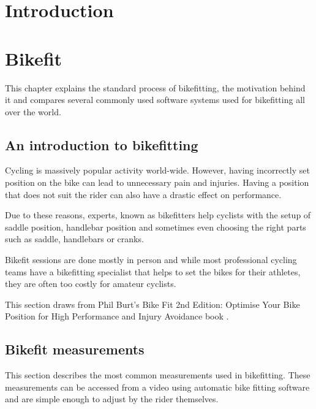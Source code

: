 
% 

\chapter{Introduction}



\chapter{Bikefit}
This chapter explains the standard process of bikefitting, the motivation behind it and compares several commonly used software systems used for bikefitting all over the world.

\section{An introduction to bikefitting}
Cycling is massively popular activity world-wide. However, having incorrectly set position on the bike can lead to unnecessary pain and injuries. Having a position that does not suit the rider can also have a drastic effect on performance.

Due to these reasons, experts, known as bikefitters help cyclists with the setup of saddle position, handlebar position and sometimes even choosing the right parts such as saddle, handlebars or cranks.

Bikefit sessions are done mostly in person and while most professional cycling teams have a bikefitting specialist that helps to set the bikes for their athletes, they are often too costly for amateur cyclists.


This section draws from Phil Burt's Bike Fit 2nd Edition: Optimise Your Bike Position for High Performance and Injury Avoidance book \cite{burtbikefit}.

\section{Bikefit measurements}
This section describes the most common measurements used in bikefitting. These measurements can be accessed from a video using automatic bike fitting software and are simple enough to adjust by the rider themselves.

